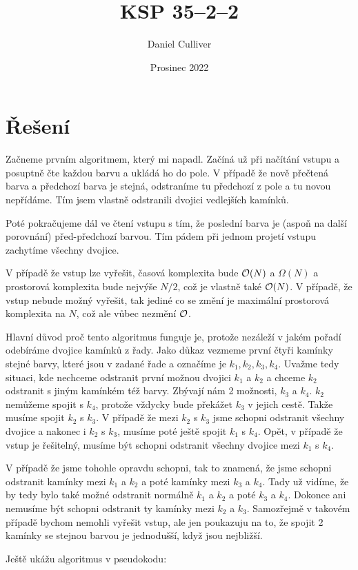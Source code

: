 \documentclass{../../../ksp}
\title{KSP 35--2--2}
\author{Daniel Culliver}
\date{Prosinec 2022}
\begin{document}
\maketitle

\section*{Řešení}
Začneme prvním algoritmem, který mi napadl. Začíná už při načítání vstupu a posuptně čte každou barvu
a ukládá ho do pole. V případě že nově přečtená barva a předchozí barva je stejná, odstraníme tu předchozí z pole
a tu novou nepřídáme. Tím jsem vlastně odstranili dvojici vedlejších kamínků.

Poté pokračujeme dál ve čtení vstupu s tím, že poslední barva je (aspoň na další porovnání) před-předchozí barvou.
Tím pádem při jednom projetí vstupu zachytíme všechny dvojice.

V případě že vstup lze vyřešit, časová komplexita bude $\mathcal{O}(N)$ a $\Omega(N)$ a prostorová komplexita
bude nejvýše $N/2$, což je vlastně také $\mathcal{O}(N)$.
V případě, že vstup nebude možný vyřešit, tak jediné co se změní je maximální prostorová komplexita na $N$,
což ale vůbec nezmění $\mathcal{O}$.

Hlavní důvod proč tento algoritmus funguje je, protože nezáleží v jakém pořadí odebíráme dvojice kamínků z řady.
Jako důkaz vezmeme první čtyři kamínky stejné barvy, které jsou v zadané řade a označíme je $k_1, k_2, k_3, k_4$.
Uvažme tedy situaci, kde nechceme odstranit první možnou dvojici $k_1$ a $k_2$
a chceme $k_2$ odstranit s jiným kamínkém též barvy. Zbývají nám 2 možnosti, $k_3$ a $k_4$. $k_2$ nemůžeme spojit s $k_4$,
protože vždycky bude překážet $k_3$ v jejich cestě. Takže musíme spojit $k_2$ s $k_3$. V případě že mezi $k_2$ s $k_3$ jsme schopni
odstranit všechny dvojice a nakonec i $k_2$ s $k_3$, musíme poté ještě spojit $k_1$ s $k_4$. Opět, v případě že vstup je řešitelný,
musíme být schopni odstranit všechny dvojice mezi $k_1$ s $k_4$.

V případě že jsme tohohle opravdu schopni, tak to znamená,
že jsme schopni odstranit kamínky mezi $k_1$ a $k_2$ a poté kamínky mezi $k_3$ a $k_4$. Tady už vidíme, že by tedy bylo také možné
odstranit normálně $k_1$ a $k_2$ a poté $k_3$ a $k_4$. Dokonce ani nemusíme být schopni odstranit ty kamínky mezi
$k_2$ a $k_3$. Samozřejmě v takovém případě bychom nemohli vyřešit vstup, ale jen poukazuju na to, že spojit 2 kamínky se stejnou barvou
je jednodušší, když jsou nejbližší.

Ještě ukážu algoritmus v pseudokodu:
\end{document}
